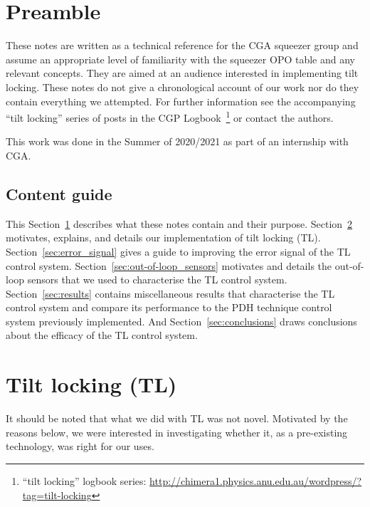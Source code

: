 \documentclass[aps,pra,superscriptaddress,reprint,nofootinbib]{revtex4-1}
\begin{document}
\maketitle

\tableofcontents

\section{Preamble}
\label{sec:preamble}

These notes are written as a technical reference for the CGA squeezer group and assume an appropriate level of familiarity with the squeezer OPO table and any relevant concepts. They are aimed at an audience interested in implementing tilt locking.
These notes do not give a chronological account of our work nor do they contain everything we attempted. For further information see the accompanying ``tilt locking'' series of posts in the CGP Logbook~\footnote{“tilt locking” logbook series: \url{http://chimera1.physics.anu.edu.au/wordpress/?tag=tilt-locking}} or contact the authors.

This work was done in the Summer of 2020/2021 as part of an internship with CGA.

\subsection{Content guide}

This Section~\ref{sec:preamble} describes what these notes contain and their purpose.
Section~\ref{sec:TL} motivates, explains, and details our implementation of tilt locking (TL).
Section~\ref{sec:error_signal} gives a guide to improving the error signal of the TL control system.
Section~\ref{sec:out-of-loop_sensors} motivates and details the out-of-loop sensors that we used to characterise the TL control system.
Section~\ref{sec:results} contains miscellaneous results that characterise the TL control system and compare its performance to the PDH technique control system previously implemented.
And Section~\ref{sec:conclusions} draws conclusions about the efficacy of the TL control system.


\section{Tilt locking (TL)}
\label{sec:TL}

It should be noted that what we did with TL was not novel. Motivated by the reasons below, we were interested in investigating whether it, as a pre-existing technology, was right for our uses.
\end{document}

